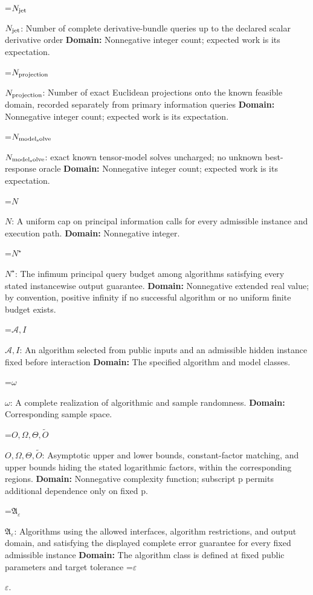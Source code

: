 \documentclass[10pt,a4paper]{article}
\newcommand{\AtlasMath}[1]{\par\begingroup\centering\setbox0=\hbox{$\displaystyle #1$}\ifdim\wd0>1.4\linewidth\typeout{ATLAS WIDE FORMULA: \the\wd0}\fi\ifdim\wd0>\linewidth\resizebox{\linewidth}{!}{\box0}\else\box0\fi\par\endgroup}
\newcommand{\AtlasInlineMath}[1]{\begingroup\setbox0=\hbox{$#1$}\ifdim\wd0>.4\linewidth\endgroup\AtlasMath{#1}\else\endgroup$#1$\fi}
\begin{document}
\AtlasInlineMath{N_{\rm jet}}: Number of complete derivative-bundle queries up to the declared scalar derivative order \textbf{Domain:} Nonnegative integer count; expected work is its expectation.



\AtlasInlineMath{N_{\rm projection}}: Number of exact Euclidean projections onto the known feasible domain, recorded separately from primary information queries \textbf{Domain:} Nonnegative integer count; expected work is its expectation.



\AtlasInlineMath{N_{\rm model_solve}}: exact known tensor-model solves uncharged; no unknown best-response oracle \textbf{Domain:} Nonnegative integer count; expected work is its expectation.



\AtlasInlineMath{N}: A uniform cap on principal information calls for every admissible instance and execution path. \textbf{Domain:} Nonnegative integer.



\AtlasInlineMath{N^\star}: The infimum principal query budget among algorithms satisfying every stated instancewise output guarantee. \textbf{Domain:} Nonnegative extended real value; by convention, positive infinity if no successful algorithm or no uniform finite budget exists.



\AtlasInlineMath{\mathcal A,I}: An algorithm selected from public inputs and an admissible hidden instance fixed before interaction \textbf{Domain:} The specified algorithm and model classes.



\AtlasInlineMath{\omega}: A complete realization of algorithmic and sample randomness. \textbf{Domain:} Corresponding sample space.



\AtlasInlineMath{O,\Omega,\Theta,\widetilde O}: Asymptotic upper and lower bounds, constant-factor matching, and upper bounds hiding the stated logarithmic factors, within the corresponding regions. \textbf{Domain:} Nonnegative complexity function; subscript p permits additional dependence only on fixed p.



\AtlasInlineMath{\mathfrak A_\varepsilon}: Algorithms using the allowed interfaces, algorithm restrictions, and output domain, and satisfying the displayed complete error guarantee for every fixed admissible instance \textbf{Domain:} The algorithm class is defined at fixed public parameters and target tolerance \AtlasInlineMath{\varepsilon}.
\end{document}
